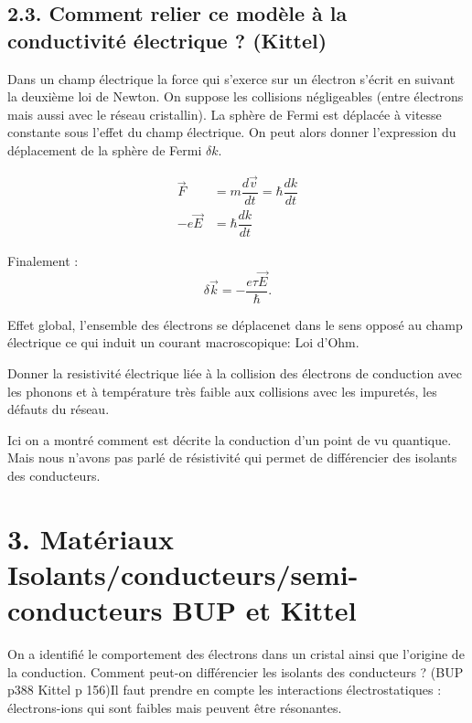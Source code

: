\documentclass[french, a4paper, 10pt, twocolumn, landscape]{article}
\begin{document}
\subsection*{2.3. Comment relier ce modèle à la conductivité électrique ? (Kittel)}

Dans un champ électrique la force qui s'exerce sur un électron s'écrit en suivant la deuxième loi de Newton. On suppose les collisions négligeables (entre électrons mais aussi avec le réseau cristallin). La sphère de Fermi est déplacée à vitesse constante sous l'effet du champ électrique. On peut alors donner l'expression du déplacement de la sphère de Fermi $\delta k$.

\begin{equation}
    \begin{array}{ll}
    \vec{F} & =m\dfrac{d\vec{v}}{dt}=\hbar\dfrac{dk}{dt}\\
        -e\vec{E} & = \hbar\dfrac{dk}{dt}
    \end{array}
\end{equation}

Finalement : 
\begin{equation}
    \delta \vec{k} = -\dfrac{e\tau\vec{E}}{\hbar}. 
\end{equation}

Effet global, l'ensemble des électrons se déplacenet dans le sens opposé au champ électrique ce qui induit un courant macroscopique: Loi d'Ohm.\medskip

Donner la resistivité électrique liée à la collision des électrons de conduction avec les phonons  et à température très faible aux collisions avec les impuretés, les défauts du réseau.\medskip

Ici on a montré comment est décrite la conduction d'un point de vu quantique.  Mais nous n'avons pas parlé de résistivité  qui permet de différencier des isolants des conducteurs.

\section*{3. Matériaux Isolants/conducteurs/semi-conducteurs BUP et Kittel}

On a identifié le comportement des électrons dans un cristal ainsi que l'origine de la conduction. Comment peut-on différencier les isolants des conducteurs ? 
(BUP p388 Kittel p 156)Il faut prendre en compte les interactions électrostatiques : électrons-ions qui sont faibles mais peuvent être résonantes. 
\end{document}
